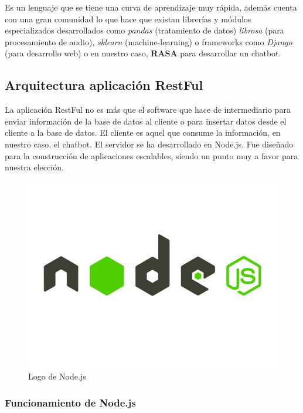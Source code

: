 Es un lenguaje que se tiene una curva de aprendizaje muy rápida, además cuenta con una gran comunidad lo que hace que existan librerías y módulos especializados desarrollados como \textit{pandas} (tratamiento de datos) \textit{librosa} (para procesamiento de audio), \textit{sklearn} (machine-learning) o frameworks como \textit{Django} (para desarrollo web) o en nuestro caso, \textbf{RASA} para desarrollar un chatbot. 

\subsection{Arquitectura aplicación RestFul}

La aplicación RestFul no es más que el software que hace de intermediario para enviar información de la base de datos al cliente o para insertar datos desde el cliente a la base de datos. El cliente es aquel que consume la información, en nuestro caso, el chatbot. El servidor se ha desarrollado en Node.js. Fue diseñado para la construcción de aplicaciones escalables, siendo un punto muy a favor para nuestra elección. 

\begin{figure}[h]
    \centering
    \includegraphics[scale=0.15]{include/figuras/node.jpg}
    \caption{Logo de Node.js}
    \label{fig:node}
\end{figure}

\subsubsection{Funcionamiento de Node.js}

